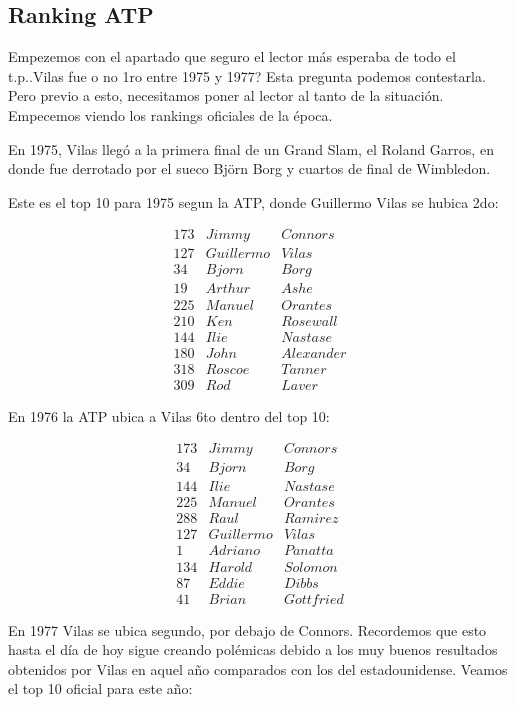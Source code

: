 \subsection{Ranking ATP}

Empezemos con el apartado que seguro el lector más esperaba de todo el t.p..Vilas fue o no 1ro entre 1975 y 1977? Esta pregunta podemos contestarla. Pero previo a esto, necesitamos poner al lector al tanto de la situación. Empecemos viendo los rankings oficiales de la época.


En 1975, Vilas llegó a la primera final de un Grand Slam, el Roland Garros, en donde fue derrotado por el sueco Björn Borg
y cuartos de final de Wimbledon.


Este es el top 10 para 1975 segun la ATP, donde Guillermo Vilas se hubica 2do:

\begin{eqnarray*}
173 & Jimmy & Connors \\
127 & Guillermo & Vilas \\
34 & Bjorn & Borg \\
19 & Arthur & Ashe \\
225 & Manuel & Orantes \\
210 & Ken & Rosewall \\
144 & Ilie & Nastase \\
180 & John & Alexander \\
318 & Roscoe & Tanner \\
309 & Rod & Laver 
\end{eqnarray*}

En 1976 la ATP ubica a Vilas 6to dentro del top 10:

\begin{eqnarray*}
173 & Jimmy & Connors \\
34 & Bjorn & Borg \\
144 & Ilie & Nastase \\
225 & Manuel & Orantes \\
288 & Raul & Ramirez \\
127 & Guillermo & Vilas \\
1 & Adriano & Panatta \\
134 & Harold & Solomon \\
87 & Eddie & Dibbs \\
41 & Brian & Gottfried 
\end{eqnarray*}

En 1977 Vilas se ubica segundo, por debajo de Connors. Recordemos que esto hasta el día de hoy sigue creando polémicas debido a los muy buenos resultados obtenidos por Vilas en aquel año comparados con los del estadounidense.
Veamos el top 10 oficial para este año:

